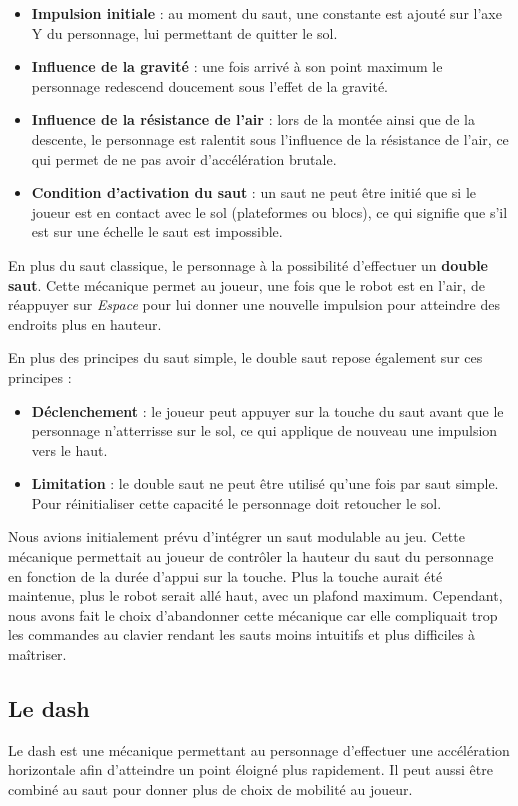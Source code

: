 \documentclass[10pt]{report}
\begin{document}
\begin{itemize}
  \item \textbf{Impulsion initiale} : au moment du saut, une constante est ajouté sur l'axe Y du personnage, lui permettant de quitter le sol.
  \item \textbf{Influence de la gravité} : une fois arrivé à son point maximum le personnage redescend doucement sous l'effet de la gravité. 
  \item \textbf{Influence de la résistance de l'air} : lors de la montée ainsi que de la descente, le personnage est ralentit sous l'influence de la résistance de l'air, ce qui permet de ne pas avoir d'accélération brutale. 
  \item \textbf{Condition d'activation du saut} : un saut ne peut être initié que si le joueur est en contact avec le sol (plateformes ou blocs), ce qui signifie que s'il est sur une échelle le saut est impossible. 
\end{itemize}

En plus du saut classique, le personnage à la possibilité d'effectuer un \textbf{double saut}. Cette mécanique permet au joueur, une fois que le robot est en l'air, de réappuyer sur \emph{Espace} pour lui donner une nouvelle impulsion pour atteindre des endroits plus en hauteur. 

En plus des principes du saut simple, le double saut repose également sur ces principes :

\begin{itemize}
  \item \textbf{Déclenchement} : le joueur peut appuyer sur la touche du saut avant que le personnage n'atterrisse sur le sol, ce qui applique de nouveau une impulsion vers le haut.
  \item \textbf{Limitation} : le double saut ne peut être utilisé qu'une fois par saut simple. Pour réinitialiser cette capacité le personnage doit retoucher le sol.
\end{itemize}


Nous avions initialement prévu d'intégrer un saut modulable au jeu. Cette mécanique permettait au joueur de contrôler la hauteur du saut du personnage en fonction de la durée d'appui sur la touche. Plus la touche aurait été maintenue, plus le robot serait allé haut, avec un plafond maximum.
Cependant, nous avons fait le choix d'abandonner cette mécanique car elle compliquait trop les commandes au clavier rendant les sauts moins intuitifs et plus difficiles à maîtriser. 

\subsection{Le dash}
Le dash est une mécanique permettant au personnage d'effectuer une accélération horizontale afin d'atteindre un point éloigné plus rapidement. Il peut aussi être combiné au saut pour donner plus de choix de mobilité au joueur.
\end{document}
